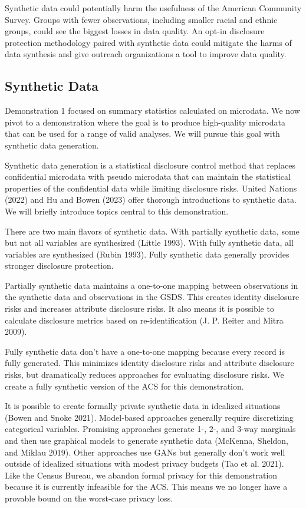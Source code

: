 \documentclass[
]{urban-formatting}
\begin{document}
Synthetic data could potentially harm the usefulness of the American
Community Survey. Groups with fewer observations, including smaller
racial and ethnic groups, could see the biggest losses in data quality.
An opt-in disclosure protection methodology paired with synthetic data
could mitigate the harms of data synthesis and give outreach
organizations a tool to improve data quality.

\subsection{Synthetic Data}

Demonstration 1 focused on summary statistics calculated on microdata.
We now pivot to a demonstration where the goal is to produce
high-quality microdata that can be used for a range of valid analyses.
We will pursue this goal with synthetic data generation.

Synthetic data generation is a statistical disclosure control method
that replaces confidential microdata with pseudo microdata that can
maintain the statistical properties of the confidential data while
limiting disclosure risks. United Nations (2022) and Hu and Bowen (2023)
offer thorough introductions to synthetic data. We will briefly
introduce topics central to this demonstration.

There are two main flavors of synthetic data. With partially synthetic
data, some but not all variables are synthesized (Little 1993). With
fully synthetic data, all variables are synthesized (Rubin 1993). Fully
synthetic data generally provides stronger disclosure protection.

Partially synthetic data maintains a one-to-one mapping between
observations in the synthetic data and observations in the GSDS. This
creates identity disclosure risks and increases attribute disclosure
risks. It also means it is possible to calculate disclosure metrics
based on re-identification (J. P. Reiter and Mitra 2009).

Fully synthetic data don't have a one-to-one mapping because every
record is fully generated. This minimizes identity disclosure risks and
attribute disclosure risks, but dramatically reduces approaches for
evaluating disclosure risks. We create a fully synthetic version of the
ACS for this demonstration.

It is possible to create formally private synthetic data in idealized
situations (Bowen and Snoke 2021). Model-based approaches generally
require discretizing categorical variables. Promising approaches
generate 1-, 2-, and 3-way marginals and then use graphical models to
generate synthetic data (McKenna, Sheldon, and Miklau 2019). Other
approaches use GANs but generally don't work well outside of idealized
situations with modest privacy budgets (Tao et al. 2021). Like the
Census Bureau, we abandon formal privacy for this demonstration because
it is currently infeasible for the ACS. This means we no longer have a
provable bound on the worst-case privacy loss.
\end{document}
